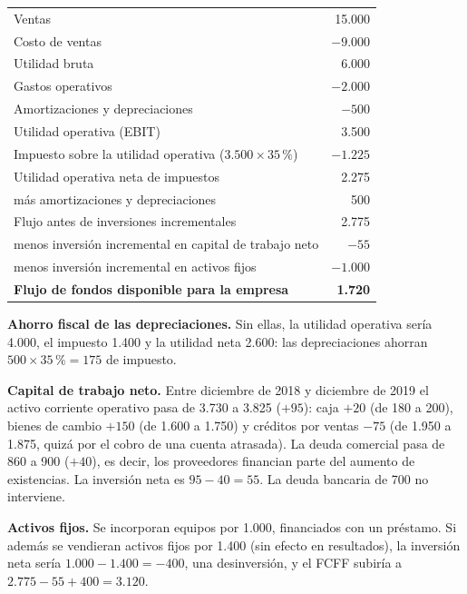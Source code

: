 \begin{ejemplo}
\begin{center}
\begin{tabular}{@{}lr@{}}
\toprule
Ventas & 15.000\\
Costo de ventas & $-9.000$\\
\midrule
Utilidad bruta & 6.000\\
Gastos operativos & $-2.000$\\
Amortizaciones y depreciaciones & $-500$\\
\midrule
Utilidad operativa (EBIT) & 3.500\\
Impuesto sobre la utilidad operativa ($3.500\times 35\,\%$) & $-1.225$\\
\midrule
Utilidad operativa neta de impuestos & 2.275\\
más amortizaciones y depreciaciones & 500\\
\midrule
Flujo antes de inversiones incrementales & 2.775\\
menos inversión incremental en capital de trabajo neto & $-55$\\
menos inversión incremental en activos fijos & $-1.000$\\
\midrule
\textbf{Flujo de fondos disponible para la empresa} & \textbf{1.720}\\
\bottomrule
\end{tabular}
\end{center}
\textbf{Ahorro fiscal de las depreciaciones.} Sin ellas, la utilidad operativa sería 4.000, el impuesto 1.400 y la utilidad neta 2.600: las depreciaciones ahorran $500\times 35\,\% = 175$ de impuesto.

\textbf{Capital de trabajo neto.} Entre diciembre de 2018 y diciembre de 2019 el activo corriente operativo pasa de 3.730 a 3.825 ($+95$): caja $+20$ (de 180 a 200), bienes de cambio $+150$ (de 1.600 a 1.750) y créditos por ventas $-75$ (de 1.950 a 1.875, quizá por el cobro de una cuenta atrasada). La deuda comercial pasa de 860 a 900 ($+40$), es decir, los proveedores financian parte del aumento de existencias. La inversión neta es $95-40 = 55$. La deuda bancaria de 700 no interviene.

\textbf{Activos fijos.} Se incorporan equipos por 1.000, financiados con un préstamo. Si además se vendieran activos fijos por 1.400 (sin efecto en resultados), la inversión neta sería $1.000-1.400 = -400$, una desinversión, y el FCFF subiría a $2.775-55+400 = 3.120$.
\end{ejemplo}

